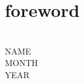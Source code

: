 \newcommand*{\forewordAuthor}{NAME}
\newcommand*{\forewordMonth}{MONTH}
\newcommand*{\forewordYear}{YEAR}
%
\chapter*{foreword}
\blindtext{}\vspace*{5em}\\
\hspace*{\fill}\forewordAuthor\\
\hspace*{\fill}\forewordMonth\\
\hspace*{\fill}\forewordYear